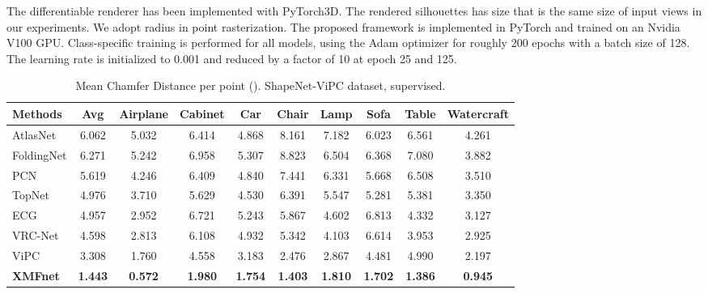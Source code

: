 \documentclass{article}
\begin{document}
The differentiable renderer has been implemented with PyTorch3D\cite{Ravi2020Accelerating3D}. The rendered silhouettes  has size  that is the same size of input views in our experiments. We adopt radius  in point rasterization. The proposed framework is implemented in PyTorch and trained on an Nvidia V100 GPU. Class-specific training is performed for all models, using the Adam optimizer \cite{Kingma2015AdamAM} for roughly 200 epochs with a batch size of 128. The learning rate is initialized to 0.001 and reduced by a factor of 10 at epoch 25 and 125. 


\begin{table}
  \caption{Mean Chamfer Distance per point (). ShapeNet-ViPC dataset, supervised.}
  \setlength\tabcolsep{4.4pt}
  \label{sup-res}
  \centering
  \begin{tabular}{lccccccccc}
\cmidrule(r){1-10}
    Methods & Avg & Airplane & Cabinet & Car & Chair & Lamp & Sofa & Table & Watercraft \\
    \midrule
    \midrule
    AtlasNet \cite{atlas} & 6.062 & 5.032 & 6.414 & 4.868 & 8.161 & 7.182 & 6.023 & 6.561 & 4.261      \\
    FoldingNet \cite{folding}  &  6.271  & 5.242 & 6.958 & 5.307 & 8.823 & 6.504 & 6.368 & 7.080 & 3.882   \\
    PCN \cite{pcn}& 5.619 & 4.246 & 6.409 & 4.840 & 7.441 & 6.331 & 5.668 & 6.508 & 3.510 \\  
    TopNet \cite{topnet}  & 4.976 & 3.710 & 5.629 & 4.530 & 6.391 & 5.547 & 5.281 & 5.381 & 3.350\\
    ECG \cite{ecg} & 4.957 & 2.952 & 6.721 & 5.243 & 5.867 & 4.602 & 6.813 & 4.332 & 3.127\\ 
    VRC-Net \cite{vrc} & 4.598 & 2.813 & 6.108 & 4.932 & 5.342 &  4.103 & 6.614 & 3.953 & 2.925\\
    ViPC \cite{vipc} & 3.308 & 1.760 & 4.558 & 3.183 & 2.476 & 2.867 & 4.481 & 4.990 & 2.197    \\
    \textbf{XMFnet} &\textbf{1.443} &  \textbf{0.572} & \textbf{1.980} & \textbf{1.754} & \textbf{1.403} & \textbf{1.810} & \textbf{1.702} & \textbf{1.386} & \textbf{0.945} \\
    \bottomrule
  \end{tabular}
  
\end{table}
\end{document}
